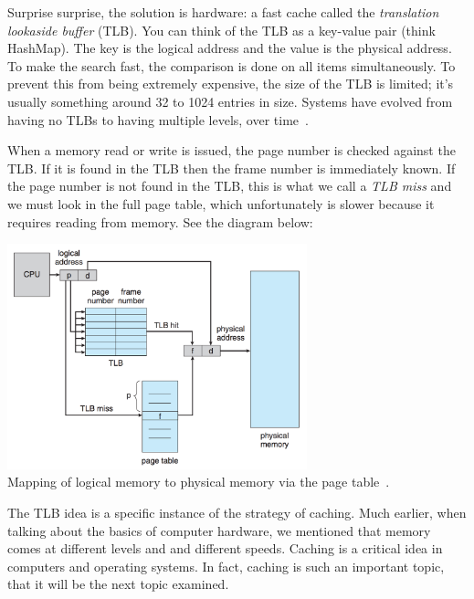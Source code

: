 Surprise surprise, the solution is hardware: a fast cache called the \textit{translation lookaside buffer} (TLB). You can think of the TLB as a key-value pair (think HashMap). The key is the logical address and the value is the physical address. To make the search fast, the comparison is done on all items simultaneously. To prevent this from being extremely expensive, the size of the TLB is limited; it's usually something around 32 to 1024 entries in size. Systems have evolved from having no TLBs to having multiple levels, over time~\cite{osc}.

When a memory read or write is issued, the page number is checked against the TLB. If it is found in the TLB then the frame number is immediately known. If the page number is not found in the TLB, this is what we call a \textit{TLB miss} and we must look in the full page table, which unfortunately is slower because it requires reading from memory. See the diagram below:

\begin{center}
\includegraphics[width=0.65\textwidth]{images/tlb-hardware.png}\\
Mapping of logical memory to physical memory via the page table~\cite{osc}.
\end{center}

The TLB idea is a specific instance of the strategy of caching. Much earlier, when talking about the basics of computer hardware, we mentioned that memory comes at different levels and and different speeds. Caching is a critical idea in computers and operating systems. In fact, caching is such an important topic, that it will be the next topic examined.



